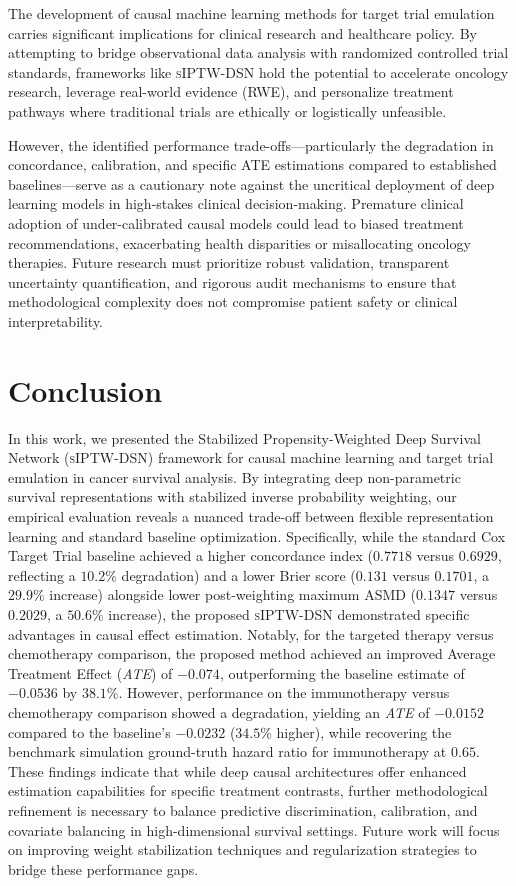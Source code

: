 \documentclass[10pt,twocolumn]{article}
\begin{document}
\begin{broader_impact}
The development of causal machine learning methods for target trial emulation carries significant implications for clinical research and healthcare policy. By attempting to bridge observational data analysis with randomized controlled trial standards, frameworks like \textsc{sIPTW-DSN} hold the potential to accelerate oncology research, leverage real-world evidence (RWE), and personalize treatment pathways where traditional trials are ethically or logistically unfeasible.

However, the identified performance trade-offs—particularly the degradation in concordance, calibration, and specific ATE estimations compared to established baselines—serve as a cautionary note against the uncritical deployment of deep learning models in high-stakes clinical decision-making. Premature clinical adoption of under-calibrated causal models could lead to biased treatment recommendations, exacerbating health disparities or misallocating oncology therapies. Future research must prioritize robust validation, transparent uncertainty quantification, and rigorous audit mechanisms to ensure that methodological complexity does not compromise patient safety or clinical interpretability.
\end{broader_impact}

\section{Conclusion}
In this work, we presented the Stabilized Propensity-Weighted Deep Survival Network (\textsc{sIPTW-DSN}) framework for causal machine learning and target trial emulation in cancer survival analysis. By integrating deep non-parametric survival representations with stabilized inverse probability weighting, our empirical evaluation reveals a nuanced trade-off between flexible representation learning and standard baseline optimization. Specifically, while the standard Cox Target Trial baseline achieved a higher concordance index ($0.7718$ versus $0.6929$, reflecting a $10.2\%$ degradation) and a lower Brier score ($0.131$ versus $0.1701$, a $29.9\%$ increase) alongside lower post-weighting maximum ASMD ($0.1347$ versus $0.2029$, a $50.6\%$ increase), the proposed \textsc{sIPTW-DSN} demonstrated specific advantages in causal effect estimation. Notably, for the targeted therapy versus chemotherapy comparison, the proposed method achieved an improved Average Treatment Effect (\textit{ATE}) of $-0.074$, outperforming the baseline estimate of $-0.0536$ by $38.1\%$. However, performance on the immunotherapy versus chemotherapy comparison showed a degradation, yielding an \textit{ATE} of $-0.0152$ compared to the baseline's $-0.0232$ ($34.5\%$ higher), while recovering the benchmark simulation ground-truth hazard ratio for immunotherapy at $0.65$. These findings indicate that while deep causal architectures offer enhanced estimation capabilities for specific treatment contrasts, further methodological refinement is necessary to balance predictive discrimination, calibration, and covariate balancing in high-dimensional survival settings. Future work will focus on improving weight stabilization techniques and regularization strategies to bridge these performance gaps.
\end{document}

